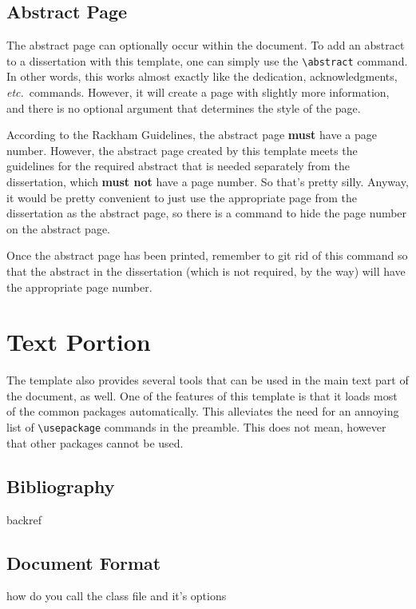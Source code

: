\subsection{Abstract Page}
The abstract page can optionally occur within the document.  To add an
abstract to a dissertation with this template, one can simply use the
\verb|\abstract| command.  In other words, this works almost exactly
like the dedication, acknowledgments, \textit{etc.}~commands.  However,
it will create a page with slightly more information, and there is no
optional argument that determines the style of the page.

According to the Rackham Guidelines, the abstract page
\textsf{\textbf{must}} have a page number.  However, the abstract page
created by this template meets the guidelines for the required abstract
that is needed separately from the dissertation, which
\textsf{\textbf{must not}} have a page number.  So that's pretty silly.
Anyway, it would be pretty convenient to just use the appropriate page
from the dissertation as the abstract page, so there is a command to
hide the page number on the abstract page.
\begin{code}
\hideabstractpagenumber
\end{code}
Once the abstract page has been printed, remember to git rid of this
command so that the abstract in the dissertation (which is not required,
by the way) will have the appropriate page number.


\section{Text Portion}
The template also provides several tools that can be used in the main
text part of the document, as well.  One of the features of this
template is that it loads most of the common packages automatically.
This alleviates the need for an annoying list of \verb|\usepackage|
commands in the preamble.  This does not mean, however that other
packages cannot be used.




\subsection{Bibliography}


backref



\subsection{Document Format}
how do you call the class file and it's options


